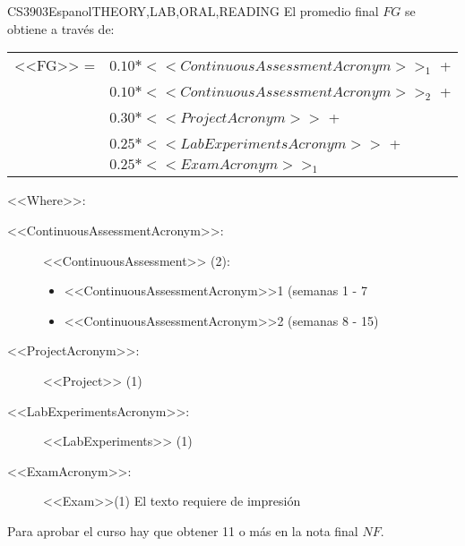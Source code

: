  
  \begin{evaluation}{CS3903}{Espanol}{THEORY,LAB,ORAL,READING}
  El promedio final $FG$ se obtiene a través de:
 
  \begin{tabular}{cl}
      <<FG>> = & $0.10*<<ContinuousAssessmentAcronym>>_{1}$ +\\
               & $0.10*<<ContinuousAssessmentAcronym>>_{2}$ +\\
               & $0.30*<<ProjectAcronym>>$ + \\
               & $0.25*<<LabExperimentsAcronym>>$ + \\
               & $0.25*<<ExamAcronym>>_{1}$
  \end{tabular}
 
  \noindent <<Where>>:
  \begin{description}
  \item[<<ContinuousAssessmentAcronym>>:] <<ContinuousAssessment>> (2):
       \begin{itemize}
             \item  <<ContinuousAssessmentAcronym>>1 (semanas 1 - 7
              \item <<ContinuousAssessmentAcronym>>2 (semanas 8 - 15) 
       \end{itemize}
   \item[<<ProjectAcronym>>:]  <<Project>> (1)
   \item[<<LabExperimentsAcronym>>:] <<LabExperiments>> (1)
   \item[<<ExamAcronym>>:] <<Exam>>(1) El texto requiere de impresión
  \end{description}
  \noindent Para aprobar el curso hay que obtener 11 o más en la nota final $NF$.
  \end{evaluation}
 
